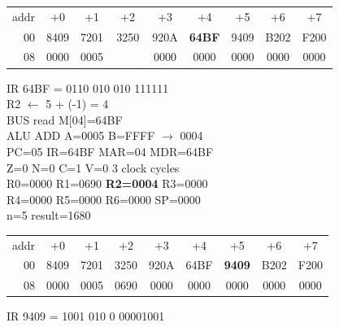\begin{tcolorbox}[stepbox, title={Step 19 \hfill PC 03 \quad ST R1, result}]
{\begin{tabular}{@{}r*{8}{c}@{}}
\textcolor{dim}{addr} & \textcolor{dim}{+0} & \textcolor{dim}{+1} & \textcolor{dim}{+2} & \textcolor{dim}{+3} & \textcolor{dim}{+4} & \textcolor{dim}{+5} & \textcolor{dim}{+6} & \textcolor{dim}{+7}\\
\textcolor{dim}{00} & 8409 & 7201 & 3250 & 920A & \cellcolor{pcc}\textbf{64BF} & 9409 & B202 & F200\\
\textcolor{dim}{08} & 0000 & \cellcolor{datac}0005 & \cellcolor{wrt}\textcolor{white}{\textbf{0690}} & 0000 & 0000 & 0000 & 0000 & 0000\\
\end{tabular}}
\end{tcolorbox}\par\vspace{3pt}
\noindent\begin{tcolorbox}[stepbox, title={Step 20 \hfill PC 04 \quad ADDI R2, R2, -1}]
\textcolor{dim}{IR} 64BF = 0110 010 010 111111\\
R2 $\leftarrow$ 5 + (-1) = 4\\
\textcolor{dim}{BUS} read M[04]=64BF\\
\textcolor{dim}{ALU} ADD A=0005 B=FFFF $\rightarrow$ 0004\\
PC=05 IR=64BF MAR=04 MDR=64BF\\
Z=0 N=0 C=1 V=0 \hfill \textcolor{dim}{3 clock cycles}\\
R0=0000 R1=0690 \textcolor{wrt}{\textbf{R2=0004}} R3=0000\\
R4=0000 R5=0000 R6=0000 SP=0000\\
\textcolor{dim}{n=5  result=1680}\\[1pt]
{\setlength{\tabcolsep}{1.6pt}\begin{tabular}{@{}r*{8}{c}@{}}
\textcolor{dim}{addr} & \textcolor{dim}{+0} & \textcolor{dim}{+1} & \textcolor{dim}{+2} & \textcolor{dim}{+3} & \textcolor{dim}{+4} & \textcolor{dim}{+5} & \textcolor{dim}{+6} & \textcolor{dim}{+7}\\
\textcolor{dim}{00} & 8409 & 7201 & 3250 & 920A & 64BF & \cellcolor{pcc}\textbf{9409} & B202 & F200\\
\textcolor{dim}{08} & 0000 & \cellcolor{datac}0005 & \cellcolor{datac}0690 & 0000 & 0000 & 0000 & 0000 & 0000\\
\end{tabular}}
\end{tcolorbox}\hfill\begin{tcolorbox}[stepbox, title={Step 21 \hfill PC 05 \quad ST R2, n}]
\textcolor{dim}{IR} 9409 = 1001 010 0 00001001\\

\end{tcolorbox}
